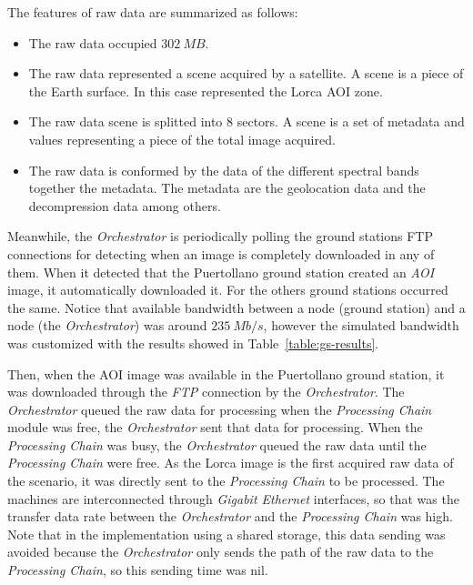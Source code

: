 The features of raw data are summarized as follows:
\begin{itemize}
\item The raw data occupied $302~MB$. 
\item The raw data represented a scene acquired by a satellite. A scene is a
  piece of the Earth surface. In this case represented the Lorca \ac{AOI} zone.
\item The raw data scene is splitted into 8 sectors. A scene is a set of metadata and
  values representing a piece of the total image acquired.
\item The raw data is conformed by the data of the different spectral bands
  together the metadata. The metadata are the geolocation data and the
  decompression data among others.
\end{itemize}


Meanwhile, the \emph{Orchestrator} is periodically polling the ground stations
\ac{FTP} connections for detecting when an image is completely downloaded in any
of them. When it detected that the Puertollano ground station created an \emph{AOI}
image, it automatically downloaded it. For the others ground stations occurred
the same. Notice that available bandwidth between a \vw node (ground station) and a \bonfire
node (the \emph{Orchestrator})  was around $235~Mb/s$, however the simulated
bandwidth was customized with the results showed in Table~\ref{table:gs-results}. 

Then, when the \ac{AOI} image was available in the Puertollano ground station,
it was downloaded through the \emph{FTP} connection by the \emph{Orchestrator}. The \emph{Orchestrator}
queued the raw data for processing when the \emph{Processing Chain} module was free,
the \emph{Orchestrator} sent that data for processing. When the
\emph{Processing Chain} was busy, the \emph{Orchestrator} queued the raw data until
the \emph{Processing Chain} were free. 
As the Lorca image is the first acquired raw data of the scenario, it was
directly sent to the \emph{Processing Chain} to be processed. The \bonfire machines are interconnected through  \emph{Gigabit Ethernet}
interfaces, so that was  the transfer data rate between the  \emph{Orchestrator}
and the \emph{Processing Chain} was high. Note that in the implementation using a shared storage,
this data sending was avoided because the \emph{Orchestrator} only sends the path
of the raw data to the \emph{Processing Chain}, so this sending time was nil.

